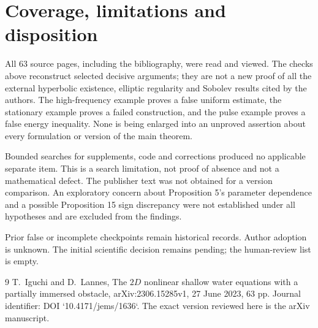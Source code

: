 \documentclass[10pt]{article}
\begin{document}
\section*{Coverage, limitations and disposition}
All 63 source pages, including the bibliography, were read and viewed. The checks above reconstruct selected decisive arguments; they are not a new proof of all the external hyperbolic existence, elliptic regularity and Sobolev results cited by the authors. The high-frequency example proves a false uniform estimate, the stationary example proves a failed construction, and the pulse example proves a false energy inequality. None is being enlarged into an unproved assertion about every formulation or version of the main theorem.\par
Bounded searches for supplements, code and corrections produced no applicable separate item. This is a search limitation, not proof of absence and not a mathematical defect. The publisher text was not obtained for a version comparison. An exploratory concern about Proposition 5’s parameter dependence and a possible Proposition 15 sign discrepancy were not established under all hypotheses and are excluded from the findings.\par
Prior false or incomplete checkpoints remain historical records. Author adoption is unknown. The initial scientific decision remains pending; the human-review list is empty.\par
9 T. Iguchi and D. Lannes, The \(2D\) nonlinear shallow water equations with a partially immersed obstacle, arXiv:2306.15285v1, 27 June 2023, 63 pp. Journal identifier: DOI `10.4171/jems/1636`. The exact version reviewed here is the arXiv manuscript.\par
\end{document}
